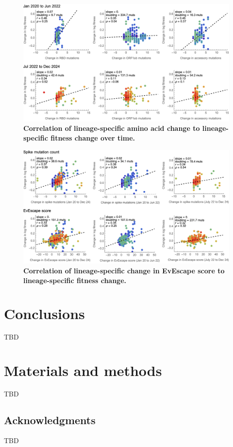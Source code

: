\documentclass[11pt,oneside,letterpaper]{article}
\begin{document}
\begin{figure}[h]
	\centering
	\includegraphics[width=1.0\textwidth]{figures/sarscov2_lineage_delta_fitness_across_time}
	\caption{\textbf{Correlation of lineage-specific amino acid change to lineage-specific fitness change over time.}
	}
	\label{sarscov2_lineage_delta_fitness_across_time}
\end{figure}

\begin{figure}[h]
	\centering
	\includegraphics[width=1.0\textwidth]{figures/sarscov2_lineage_delta_fitness_vs_evescape}
	\caption{\textbf{Correlation of lineage-specific change in EvEscape score to lineage-specific fitness change.}
	}
	\label{sarscov2_lineage_delta_fitness_vs_evescape}
\end{figure}

\section*{Conclusions}

TBD

\section*{Materials and methods}

TBD

\subsection*{Acknowledgments}

TBD



\end{document}
